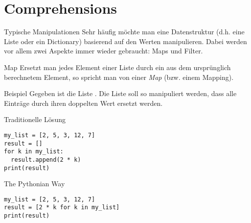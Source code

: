 \section{Comprehensions}

\begin{frame}
\begin{block}{Typische Manipulationen}
\vspace{2pt}
Sehr häufig möchte man eine Datenstruktur (d.h. eine Liste oder ein Dictionary) basierend auf den Werten manipulieren. Dabei werden vor allem zwei Aspekte immer wieder gebraucht: Maps und Filter. 
\end{block}

\end{frame}

\begin{frame}
\begin{block}{Map}
\vspace{2pt}
Ersetzt man jedes Element einer Liste durch ein aus dem ursprünglich berechnetem Element, so spricht man von einer \emph{Map} (bzw. einem Mapping). 
\end{block}

\pause 

\vspace{12pt}

\begin{exampleblock}{Beispiel}
\vspace{2pt}
Gegeben ist die Liste . Die Liste soll so manipuliert werden, dass alle Einträge durch ihren doppelten Wert ersetzt werden. 
\end{exampleblock}

\end{frame}

\begin{fragile}
\begin{overprint}

\begin{block}{Traditionelle Lösung}
\vspace{2pt}
\begin{verbatim}
my_list = [2, 5, 3, 12, 7]
result = []
for k in my_list: 
  result.append(2 * k)
print(result)
\end{verbatim}
\end{block}

\vspace{12pt}

\pause

\begin{block}{The Pythonian Way}
\vspace{2pt}
\begin{verbatim}
my_list = [2, 5, 3, 12, 7]
result = [2 * k for k in my_list]
print(result)
\end{verbatim}
\end{block}
\end{overprint}
\end{fragile}



